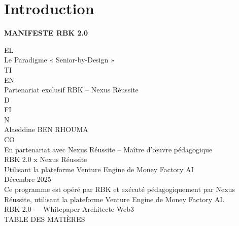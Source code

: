 \documentclass[12pt,landscape,a4paper]{article}
\begin{document}
\section*{Introduction}
\begin{center}\Large\textbf{MANIFESTE RBK 2.0}\end{center}
\vspace{0.5em}
\vspace{0.5em}
\vspace{0.5em}
\vspace{0.5em}
EL\\
Le Paradigme « Senior-by-Design »\\
\vspace{0.5em}
\vspace{0.5em}
\vspace{0.5em}
\vspace{0.5em}
TI\\
EN\\
Partenariat exclusif RBK – Nexus Réussite\\
\vspace{0.5em}
\vspace{0.5em}
\vspace{0.5em}
\vspace{0.5em}
D\\
FI\\
N\\
Alaeddine BEN RHOUMA\\
CO\\
En partenariat avec Nexus Réussite – Maître d’œuvre pédagogique\\
\vspace{0.5em}
\vspace{0.5em}
RBK 2.0 x Nexus Réussite\\
Utilisant la plateforme Venture Engine de Money Factory AI\\
\vspace{0.5em}
Décembre 2025\\
\vspace{0.5em}
Ce programme est opéré par RBK et exécuté pédagogiquement par Nexus Réussite, utilisant la plateforme Venture Engine de Money Factory AI.\\
RBK 2.0 — Whitepaper Architecte Web3\\
\vspace{0.5em}
\vspace{0.5em}
\vspace{0.5em}
TABLE DES MATIÈRES\\
\vspace{0.5em}
\end{document}
